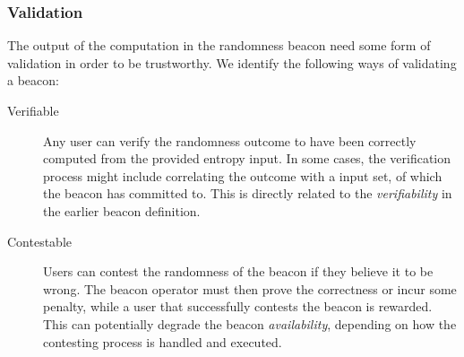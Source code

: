 \subsubsection{Validation}
The output of the computation in the randomness beacon need some form of validation in order to be trustworthy.
We identify the following ways of validating a beacon:

\begin{description}
    \item[Verifiable]
        Any user can verify the randomness outcome to have been correctly computed from the provided entropy input.
        In some cases, the verification process might include correlating the outcome with a input set, of which the beacon has committed to.
        This is directly related to the \emph{verifiability} in the earlier beacon definition.

    \item[Contestable]
        Users can contest the randomness of the beacon if they believe it to be wrong.
        The beacon operator must then prove the correctness or incur some penalty, while a user that successfully contests the beacon is rewarded. 
        This can potentially degrade the beacon \emph{availability}, depending on how the contesting process is handled and executed.
\end{description}



